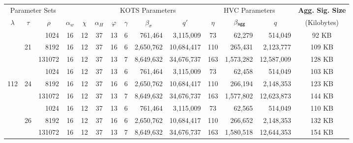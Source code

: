\bgroup
\setlength{\tabcolsep}{0.5em}
\renewcommand{\arraystretch}{1.05}
\begin{table}\centering
    \begin{tabular}{ccr|cc|cccrr|crr|c}%
  
      \multicolumn{3}{c|}{Parameter Sets}
      & \multicolumn{2}{c|}{}
      & \multicolumn{5}{c|}{KOTS Parameters}  
      & \multicolumn{3}{c|}{HVC Parameters}  
      &  {\bf Agg. Sig. Size}\\%
      
      $\lambda$      & $\tau$
      & \multicolumn{1}{c|}{$\rho$}& $\alpha_w$ & $\chi$  &$\alpha_H$& $\varphi$ 
      & $\gamma$                      & \multicolumn{1}{c}{$\beta_\sigma$}     
      & \multicolumn{1}{c|}{$q'$}                     & $\eta$       
      & $\beta_{\mathsf{agg}}\quad$                  & \multicolumn{1}{c|}{$q$} 
      & (Kilobytes) \\\toprule
  
  

          &       &   1024  &        16 &    12 &        37 &    13 &       6 &        761,464 &  3,115,009 &    73 &       62,279 &    514,049 & 92 KB  \\
          &    21 &   8192  &        16 &    12 &        37 &    16 &       6 &      2,650,762 & 10,684,417 &   110 &      265,431 &  2,123,777 & 109 KB \\
          &       & 131072  &        16 &    12 &        37 &    13 &       7 &      8,649,632 & 34,676,737 &   163 &    1,573,282 & 12,587,009 & 128 KB \\\cline{2-14}

          &       &   1024  &        16 &    12 &        37 &    13 &       6 &        761,464 &  3,115,009 &    73 &       62,458 &    514,049 & 103 KB \\
      112 &    24 &   8192  &        16 &    12 &        37 &    16 &       6 &      2,650,762 & 10,684,417 &   110 &      266,194 &  2,148,353 & 123 KB \\
          &       & 131072  &        16 &    12 &        37 &    13 &       7 &      8,649,632 & 34,676,737 &   163 &    1,577,802 & 12,623,873 & 144 KB \\\cline{2-14}

          &       &   1024  &        16 &    12 &        37 &    13 &       6 &        761,464 &  3,115,009 &    73 &       62,565 &    514,049 & 110 KB \\
          &    26 &   8192  &        16 &    12 &        37 &    16 &       6 &      2,650,762 & 10,684,417 &   110 &      266,652 &  2,148,353 & 132 KB \\
          &       & 131072  &        16 &    12 &        37 &    13 &       7 &      8,649,632 & 34,676,737 &   163 &    1,580,518 & 12,644,353 & 154 KB \\\midrule


\end{tabular}
\end{table}
